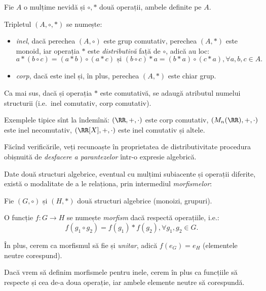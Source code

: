 \begin{definition}\label{def:inel-corp}
  Fie $A$ o mulțime nevidă și $\circ, \ast$ două operații, ambele definite pe $A$.

  Tripletul $(A, \circ, \ast)$ se numește:
  \begin{itemize} 
    \item \emph{inel}, dacă perechea $(A, \circ)$ este grup comutativ, perechea $(A, \ast)$
      este monoid, iar operația $\ast$ este \emph{distributivă} față de $\circ$, adică au loc:
      \[
        a \ast (b \circ c) = (a \ast b) \circ (a \ast c) \text{ și } %
        (b \circ c) \ast a = (b \ast a) \circ (c \ast a), \forall a, b, c \in A.
      \]
    \item \emph{corp}, dacă este inel și, în plus, perechea $(A, \ast)$ este chiar grup.
  \end{itemize}

  Ca mai sus, dacă și operația $\ast$ este comutativă, se adaugă atributul 
  numelui structurii (i.e.\ inel comutativ, corp comutativ).
\end{definition}

Exemplele tipice sînt la îndemînă: $(\RR, +, \cdot)$ este corp comutativ,
$(M_n(\RR), +, \cdot)$ este inel necomutativ, $(\RR[X], +, \cdot)$ este inel
comutativ și altele.

Făcînd verificările, veți recunoaște în proprietatea de distributivitate
procedura obișnuită de \emph{desfacere a parantezelor} într-o expresie algebrică.

Date două structuri algebrice, eventual cu mulțimi subiacente și operații diferite,
există o modalitate de a le relaționa, prin intermediul \emph{morfismelor}:

\begin{definition}\label{def:morfism} 
  Fie $(G, \circ)$ și $(H, \ast)$ două structuri algebrice (monoizi, grupuri).

  O funcție $f: G \to H$ se numește \emph{morfism} dacă respectă operațiile, i.e.:
  \[
    f(g_1 \circ g_2) = f(g_1) \ast f(g_2), \forall g_1, g_2 \in G.
  \]

  În plus, cerem ca morfismul să fie și \emph{unitar}, adică $f(e_G) = e_H$
  (elementele neutre corespund).
\end{definition}

Dacă vrem să definim morfismele pentru inele, cerem în plus ca funcțiile să
respecte și cea de-a doua operație, iar ambele elemente neutre să corespundă.

